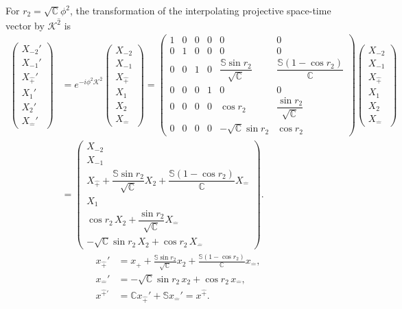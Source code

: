 \documentclass[foundations,article,submit,pdftex,moreauthors]{Definitions/mdpi}
\begin{document}
For $r_2=\sqrt{\mathbb{C}}\phi^{2}$, the transformation of the interpolating
projective space-time vector by $\mathcal{K}^{\hat{2}}$ is
\begin{align}
\begin{pmatrix}
X_{-2}'\\ X_{-1}'\\ X_{\hat{+}}'\\ X_1'\\ X_2'\\ X_{\hat{-}}'
\end{pmatrix}
&=e^{-i\phi^{2}\mathcal{K}^{\hat{2}}}
\begin{pmatrix}
X_{-2}\\ X_{-1}\\ X_{\hat{+}}\\ X_1\\ X_2\\ X_{\hat{-}}
\end{pmatrix}
=\begin{pmatrix}
1 & 0 & 0 & 0 & 0 & 0\\
0 & 1 & 0 & 0 & 0 & 0\\
0 & 0 & 1 & 0 & \dfrac{\mathbb{S}\sin r_2}{\sqrt{\mathbb{C}}} & \dfrac{\mathbb{S}(1-\cos r_2)}{\mathbb{C}}\\
0 & 0 & 0 & 1 & 0 & 0\\
0 & 0 & 0 & 0 & \cos r_2 & \dfrac{\sin r_2}{\sqrt{\mathbb{C}}}\\
0 & 0 & 0 & 0 & -\sqrt{\mathbb{C}}\sin r_2 & \cos r_2\label{A112}
\end{pmatrix}
\begin{pmatrix}
X_{-2}\\ X_{-1}\\ X_{\hat{+}}\\ X_1\\ X_2\\ X_{\hat{-}}
\end{pmatrix}\\
&=\begin{pmatrix}
X_{-2}\\ X_{-1}\\
X_{\hat{+}}+\dfrac{\mathbb{S}\sin r_2}{\sqrt{\mathbb{C}}}X_2
+\dfrac{\mathbb{S}(1-\cos r_2)}{\mathbb{C}}X_{\hat{-}}\\
X_1\\
\cos r_2\,X_2+\dfrac{\sin r_2}{\sqrt{\mathbb{C}}}X_{\hat{-}}\\
-\sqrt{\mathbb{C}}\sin r_2\,X_2+\cos r_2\,X_{\hat{-}} 
\end{pmatrix}.
\end{align}
\begin{align}
x_{\hat{+}}'&=x_{\hat{+}}
 +\frac{\mathbb{S}\sin r_2}{\sqrt{\mathbb{C}}}x_2
 +\frac{\mathbb{S}(1-\cos r_2)}{\mathbb{C}}x_{\hat{-}}, \nonumber\\
x_{\hat{-}}'&=-\sqrt{\mathbb{C}}\sin r_2\,x_2
 +\cos r_2\,x_{\hat{-}}, \nonumber\\
x^{\hat{+}\prime}
&=\mathbb{C}x_{\hat{+}}'+\mathbb{S}x_{\hat{-}}'
=x^{\hat{+}}.
\end{align}


\end{document}
